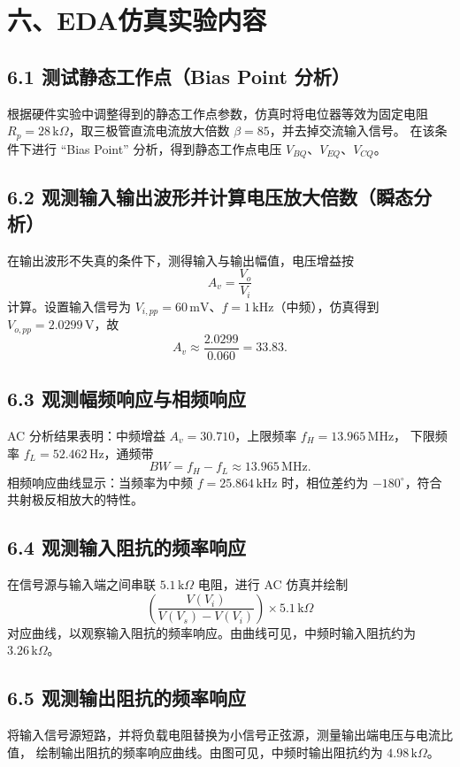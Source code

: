 \documentclass[a4paper,12pt]{article}
\begin{document}
\section*{六、EDA仿真实验内容}
\subsection*{6.1 测试静态工作点（Bias Point 分析）}
根据硬件实验中调整得到的静态工作点参数，仿真时将电位器等效为固定电阻
$R_p=28\,\mathrm{k}\Omega$，取三极管直流电流放大倍数 $\beta=85$，并去掉交流输入信号。
在该条件下进行 ``Bias Point'' 分析，得到静态工作点电压 $V_{BQ}$、$V_{EQ}$、$V_{CQ}$。

\subsection*{6.2 观测输入输出波形并计算电压放大倍数（瞬态分析）}
在输出波形不失真的条件下，测得输入与输出幅值，电压增益按
\[
A_v=\frac{V_o}{V_i}
\]
计算。设置输入信号为 $V_{i,pp}=60\,\mathrm{mV}$、$f=1\,\mathrm{kHz}$（中频），仿真得到
$V_{o,pp}=2.0299\,\mathrm{V}$，故
\[
A_v\approx\frac{2.0299}{0.060}=33.83.
\]

\subsection*{6.3 观测幅频响应与相频响应}
AC 分析结果表明：中频增益 $A_v=30.710$，上限频率 $f_H=13.965\,\mathrm{MHz}$，
下限频率 $f_L=52.462\,\mathrm{Hz}$，通频带
\[
BW=f_H-f_L\approx 13.965\,\mathrm{MHz}.
\]
相频响应曲线显示：当频率为中频 $f=25.864\,\mathrm{kHz}$ 时，相位差约为
$-180^\circ$，符合共射极反相放大的特性。

\subsection*{6.4 观测输入阻抗的频率响应}
在信号源与输入端之间串联 $5.1\,\mathrm{k}\Omega$ 电阻，进行 AC 仿真并绘制
\[
\left(\frac{V(V_i)}{V(V_s)-V(V_i)}\right)\times 5.1\,\mathrm{k}\Omega
\]
对应曲线，以观察输入阻抗的频率响应。由曲线可见，中频时输入阻抗约为
$3.26\,\mathrm{k}\Omega$。

\subsection*{6.5 观测输出阻抗的频率响应}
将输入信号源短路，并将负载电阻替换为小信号正弦源，测量输出端电压与电流比值，
绘制输出阻抗的频率响应曲线。由图可见，中频时输出阻抗约为
$4.98\,\mathrm{k}\Omega$。
\end{document}
